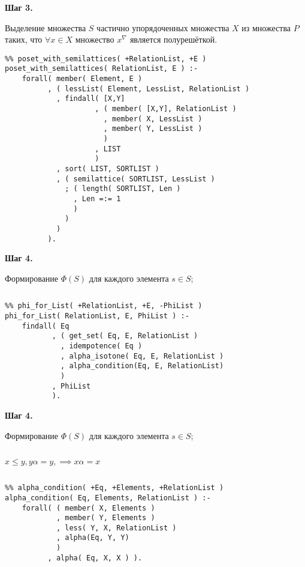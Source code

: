 \documentclass{beamer}
\newcommand{\retline}{

$ $

}
\begin{document}
\begin{frame}[fragile]
{\bf Шаг 3.}

Выделение множества $S$ частично упорядоченных множества $X$ из множества $P$ таких, что $\forall x \in X$ множество $x^\nabla$ является полурешёткой.

{\tiny
\begin{lstlisting}
%% poset_with_semilattices( +RelationList, +E )
poset_with_semilattices( RelationList, E ) :-
    forall( member( Element, E )
          , ( lessList( Element, LessList, RelationList )
            , findall( [X,Y]
                     , ( member( [X,Y], RelationList )
                       , member( X, LessList )
                       , member( Y, LessList )
                       )
                     , LIST
                     )
            , sort( LIST, SORTLIST )
            , ( semilattice( SORTLIST, LessList )
              ; ( length( SORTLIST, Len )
                , Len =:= 1
                )
              )
            )
          ).
\end{lstlisting}
}
\end{frame}

\begin{frame}[fragile]
{\bf Шаг 4.}

Формирование $\Phi(S)$ для каждого элемента $s \in S$;
{\retline}

{\scriptsize
\begin{lstlisting}
%% phi_for_List( +RelationList, +E, -PhiList )
phi_for_List( RelationList, E, PhiList ) :-
    findall( Eq
           , ( get_set( Eq, E, RelationList )
             , idempotence( Eq )
             , alpha_isotone( Eq, E, RelationList )
             , alpha_condition(Eq, E, RelationList)
             )
           , PhiList
           ).
\end{lstlisting}
}
\end{frame}

\begin{frame}[fragile]
{\bf Шаг 4.}

Формирование $\Phi(S)$ для каждого элемента $s \in S$;
{\retline}

$x \leq y, y\alpha = y, \implies x\alpha = x$
{\retline}

{\scriptsize
\begin{lstlisting}
%% alpha_condition( +Eq, +Elements, +RelationList )
alpha_condition( Eq, Elements, RelationList ) :-
    forall( ( member( X, Elements )
            , member( Y, Elements )
            , less( Y, X, RelationList )
            , alpha(Eq, Y, Y)
            )
          , alpha( Eq, X, X ) ).
\end{lstlisting}
}
\end{frame}
\end{document}
